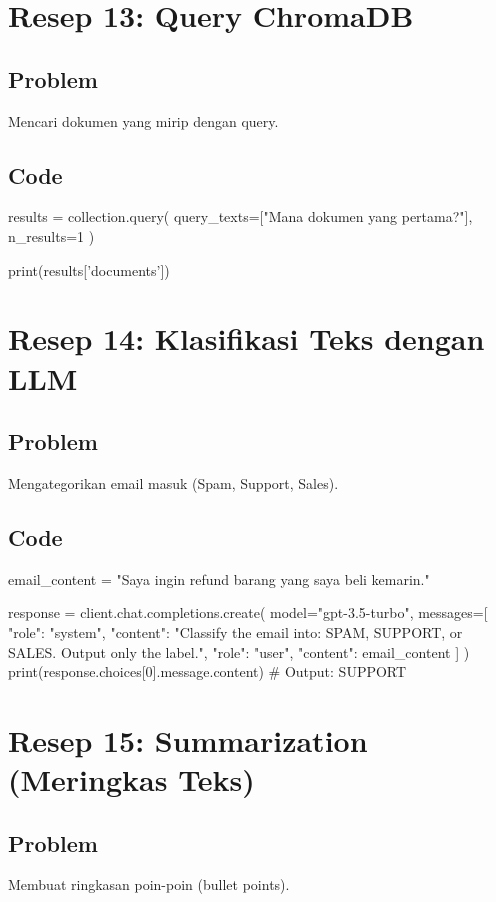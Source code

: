 \section{Resep 13: Query ChromaDB}

\subsection*{Problem}
Mencari dokumen yang mirip dengan query.

\subsection*{Code}
\begin{codeblock}[language=Python]
results = collection.query(
    query_texts=["Mana dokumen yang pertama?"],
    n_results=1
)

print(results['documents'])
\end{codeblock}

\section{Resep 14: Klasifikasi Teks dengan LLM}

\subsection*{Problem}
Mengategorikan email masuk (Spam, Support, Sales).

\subsection*{Code}
\begin{codeblock}[language=Python]
email_content = "Saya ingin refund barang yang saya beli kemarin."

response = client.chat.completions.create(
    model="gpt-3.5-turbo",
    messages=[
        {"role": "system", "content": "Classify the email into: SPAM, SUPPORT, or SALES. Output only the label."},
        {"role": "user", "content": email_content}
    ]
)
print(response.choices[0].message.content) # Output: SUPPORT
\end{codeblock}

\section{Resep 15: Summarization (Meringkas Teks)}

\subsection*{Problem}
Membuat ringkasan poin-poin (bullet points).

